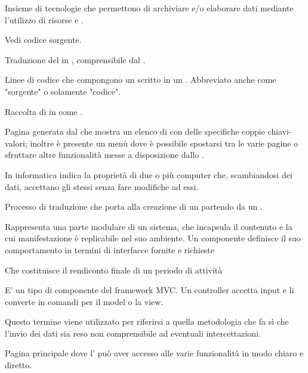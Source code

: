 { 
{Insieme di tecnologie che permettono di archiviare e/o elaborare dati mediante l'utilizzo di risorse  e  .}

{Vedi codice sorgente.}

{Traduzione del  in , comprensibile dal .}

{Linee di codice che compongono un  scritto in un . Abbreviato anche come "sorgente" o solamente "codice".}

{Raccolta di  in  come .}

{Pagina generata dal   che mostra un elenco di  con delle specifiche coppie chiavi-valori; inoltre è presente un menù dove è possibile spostarsi tra le varie pagine  o sfruttare altre funzionalità messe a disposizione dallo .}

{In informatica indica la proprietà di due o più computer che, scambiandosi dei dati, accettano gli stessi  senza fare modifiche ad essi.}

{Processo di traduzione che porta alla creazione di un  partendo da un .}

{Rappresenta una parte modulare di un sistema, che incapsula il contenuto e la cui manifestazione è replicabile nel suo ambiente. 
 Un componente definisce il suo comportamento in termini di interfacce fornite e richieste}

{Che costituisce il rendiconto finale di un periodo di attività}

{E' un tipo di componente del framework MVC.
 Un controller accetta input e li converte  in comandi per il model o la view.} 
 
{Questo termine viene utilizzato per riferirsi a quella metodologia che fa sì che l'invio dei dati sia reso non comprensibile ad eventuali intercettazioni.}




{Pagina principale dove l' può aver accesso alle varie funzionalità in modo chiaro e diretto.}

}
